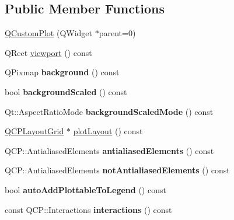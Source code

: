 \subsection*{Public Member Functions}
\begin{DoxyCompactItemize}
\item 
\mbox{\hyperlink{class_q_custom_plot_a45b99626558651a6428b83972b0b34b8}{Q\+Custom\+Plot}} (Q\+Widget $\ast$parent=0)
\item 
Q\+Rect \mbox{\hyperlink{class_q_custom_plot_a19842409b18f556b256d05e97fffc670}{viewport}} () const
\item 
\mbox{\label{class_q_custom_plot_a5b9bbc838cb856e31b39c050fad49f9a}} 
Q\+Pixmap {\bfseries background} () const
\item 
\mbox{\label{class_q_custom_plot_aac96f3a0f5070228ed13602976886b80}} 
bool {\bfseries background\+Scaled} () const
\item 
\mbox{\label{class_q_custom_plot_af8f1ebfdbf48d7c49f95136475d55b14}} 
Qt\+::\+Aspect\+Ratio\+Mode {\bfseries background\+Scaled\+Mode} () const
\item 
\mbox{\hyperlink{class_q_c_p_layout_grid}{Q\+C\+P\+Layout\+Grid}} $\ast$ \mbox{\hyperlink{class_q_custom_plot_af1a1f1f571237deb7c2bd34a5e9f018f}{plot\+Layout}} () const
\item 
\mbox{\label{class_q_custom_plot_a631762eb183aceecee73d30e108641ee}} 
Q\+C\+P\+::\+Antialiased\+Elements {\bfseries antialiased\+Elements} () const
\item 
\mbox{\label{class_q_custom_plot_a75571bc5b2167e83def132fc993091b3}} 
Q\+C\+P\+::\+Antialiased\+Elements {\bfseries not\+Antialiased\+Elements} () const
\item 
\mbox{\label{class_q_custom_plot_ac4b87de13eaceadc8db5a66654197689}} 
bool {\bfseries auto\+Add\+Plottable\+To\+Legend} () const
\item 
\mbox{\label{class_q_custom_plot_a2c78c5fd2943c148ab76652801d3f2dc}} 
const Q\+C\+P\+::\+Interactions {\bfseries interactions} () const
\item 
\mbox{\label{class_q_custom_plot_a5441d11013afeaf4b8f2ea06e8624a25}} 

\end{DoxyCompactItemize}
